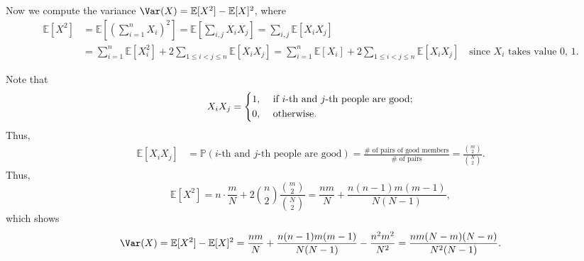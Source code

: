 Now we compute the variance \(\Var(X) = \mathbb{E} [X^2] - \mathbb{E} [X]^2\), where 
\begin{align*}
    \mathbb{E} [X^2] &= \mathbb{E} \left[ \left( \sum_{i=1}^n X_i  \right)^2  \right] = \mathbb{E} \left[ \sum_{i, j} X_i X_j  \right] = \sum_{i, j} \mathbb{E} [X_i X_j] \\
    &= \sum_{i=1}^n \mathbb{E} [X_i^2] + 2 \sum_{1 \le i < j \le n} \mathbb{E} [X_i X_j] = \sum_{i=1}^n \mathbb{E} [X_i] + 2 \sum_{1 \le i < j \le n} \mathbb{E} [X_i X_j] \quad \text{since } X_i \text{ takes value 0, 1.}         
\end{align*} 

Note that 
\[
    X_i X_j = \begin{dcases}
        1, &\text{ if } i\text{-th and } j\text{-th people are good};\\
        0, &\text{ otherwise}  .
    \end{dcases}
\]
Thus,
\begin{align*}
    \mathbb{E} [X_i X_j] &= \mathbb{P} \left( i\text{-th and } j \text{-th people are good}   \right) = \frac{\# \text{ of pairs of good members} }{\# \text{ of pairs}} = \frac{\binom{m}{2}}{\binom{N}{2}}. 
\end{align*}
Thus,
\[
    \mathbb{E} [X^2] = n \cdot \frac{m}{N} + 2 \binom{n}{2} \frac{\binom{m}{2}}{\binom{N}{2}} = \frac{nm}{N} + \frac{n(n - 1)m(m - 1)}{N(N - 1)},
\]
which shows 
\[
    \Var(X) = \mathbb{E} [X^2] - \mathbb{E} [X]^2 = \frac{nm}{N} + \frac{n(n - 1)m(m - 1)}{N(N - 1)} - \frac{n^2 m^2}{N^2} = \frac{nm(N - m)(N - n)}{N^2(N - 1)}. 
\]


